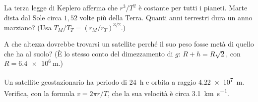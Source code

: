 \begin{esercizio}
La terza legge di Keplero afferma che $r^3/T^2$ è costante per tutti i pianeti. Marte dista dal Sole circa $1{,}52$ volte più della Terra. Quanti anni terrestri dura un anno marziano? (Usa $T_M/T_T = (r_M/r_T)^{3/2}$.)\\
\end{esercizio}

\begin{esercizio}
A che altezza dovrebbe trovarsi un satellite perché il suo peso fosse metà di quello che ha al suolo? (È lo stesso conto del dimezzamento di $g$: $R + h = R\sqrt{2}$, con $R = \SI{6,4e6}{\metre}$.)\\
\end{esercizio}

\begin{esercizio}
Un satellite geostazionario ha periodo di \SI{24}{\hour} e orbita a raggio \SI{4,22e7}{\metre}. Verifica, con la formula $v = 2\pi r / T$, che la sua velocità è circa \SI{3,1}{\kilo\metre\per\second}.\\
\end{esercizio}

